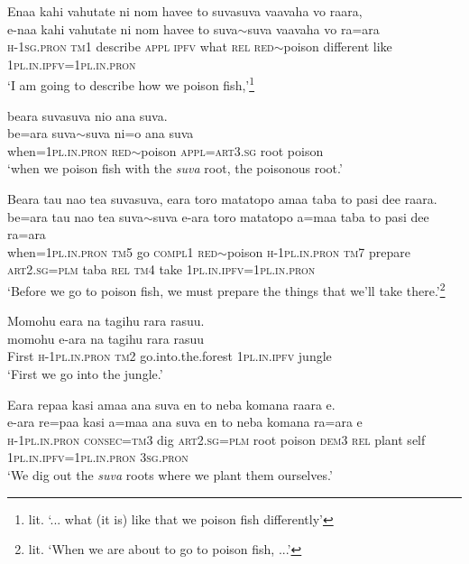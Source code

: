 \ea\label{ex:text30-1}
Enaa kahi vahutate ni nom havee to suvasuva vaavaha vo raara,\\
\gll e-naa	kahi	vahutate	ni	nom	havee	to	suva{$\sim$}suva	vaavaha	vo	ra=ara\\
     \textsc{h}-1\textsc{sg}.\textsc{pron}	\textsc{tm}1	describe	\textsc{appl}	\textsc{ipfv}	what	\textsc{rel}	\textsc{red}{$\sim$}poison	different	like	1\textsc{pl}.\textsc{in}.\textsc{ipfv}=1\textsc{pl}.\textsc{in}.\textsc{pron}\\
\glt `I am going to describe how we poison fish,'\footnote{lit. `... what (it is) like that we poison fish differently'}
\z

\ea\label{ex:text30-2}
beara suvasuva nio ana suva.\\
\gll be=ara	suva{$\sim$}suva	ni=o	ana	suva\\
     when=1\textsc{pl}.\textsc{in}.\textsc{pron}	\textsc{red}{$\sim$}poison	\textsc{appl}=\textsc{art}3.\textsc{sg}	root	poison\\
\glt `when we poison fish with the \textit{suva} root, the poisonous root.'
\z

\ea\label{ex:text30-3}
Beara tau nao tea suvasuva, eara toro matatopo amaa taba to pasi dee raara.\\
\gll be=ara	tau	nao	tea	suva{$\sim$}suva	e-ara	toro	matatopo	a=maa	taba	to	pasi	dee	ra=ara\\
     when=1\textsc{pl}.\textsc{in}.\textsc{pron}	\textsc{tm}5	go	\textsc{compl}1	\textsc{red}{$\sim$}poison	\textsc{h}-1\textsc{pl}.\textsc{in}.\textsc{pron}	\textsc{tm}7	prepare	\textsc{art}2.\textsc{sg}=\textsc{plm}	taba	\textsc{rel}	\textsc{tm}4	take	1\textsc{pl}.\textsc{in}.\textsc{ipfv}=1\textsc{pl}.\textsc{in}.\textsc{pron}\\
\glt `Before we go to poison fish, we must prepare the things that we'll take there.'\footnote{lit. `When we are about to go to poison fish, ...'}
\z

\ea\label{ex:text30-4}
Momohu eara na tagihu rara rasuu.\\
\gll momohu	e-ara	na	tagihu	rara	rasuu\\
     First	\textsc{h}-1\textsc{pl}.\textsc{in}.\textsc{pron}	\textsc{tm}2	go.into.the.forest	1\textsc{pl}.\textsc{in}.\textsc{ipfv}	jungle\\
\glt `First we go into the jungle.'
\z

\ea\label{ex:text30-5}
Eara repaa kasi amaa ana suva en to neba komana raara e.\\
\gll e-ara	re=paa	kasi	a=maa	ana	suva	en	to	neba	komana	ra=ara	e\\
     \textsc{h}-1\textsc{pl}.\textsc{in}.\textsc{pron}	\textsc{consec}=\textsc{tm}3	dig	\textsc{art}2.\textsc{sg}=\textsc{plm}	root	poison	\textsc{dem}3	\textsc{rel}	plant	self	1\textsc{pl}.\textsc{in}.\textsc{ipfv}=1\textsc{pl}.\textsc{in}.\textsc{pron}	3\textsc{sg}.\textsc{pron}\\
\glt `We dig out the \textit{suva} roots where we plant them ourselves.'
\z

